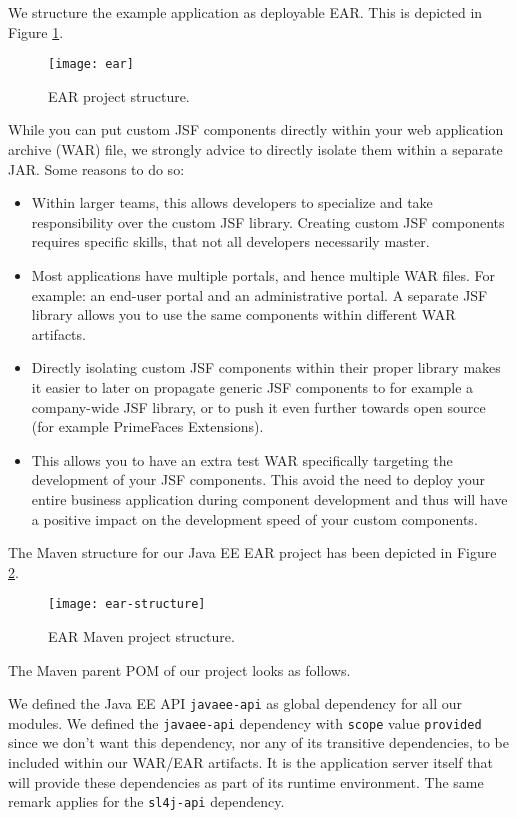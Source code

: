 We structure the example application as deployable EAR. This is depicted in Figure \ref{fig:ear}.
\begin{figure}[htbp]
	\begin{center}
		\texttt{[image: ear]}
		\caption{EAR project structure.}
		\label{fig:ear}
	\end{center}
\end{figure}
While you can put custom JSF components directly within your web application archive (WAR) file,
we strongly advice to directly isolate them within a separate JAR.
Some reasons to do so:
\begin{itemize}
	\item Within larger teams, this allows developers to specialize and take responsibility over the custom JSF library.
	Creating custom JSF components requires specific skills, that not all developers necessarily master.
	\item Most applications have multiple portals, and hence multiple WAR files. For example: an end-user portal and an administrative portal. A separate JSF library allows you to use the same components within different WAR artifacts.
	\item Directly isolating custom JSF components within their proper library makes it easier to later on propagate generic JSF components to for example a company-wide JSF library, or to push it even further towards open source (for example PrimeFaces Extensions).
	\item This allows you to have an extra test WAR specifically targeting the development of your JSF components.
	This avoid the need to deploy your entire business application during component development and thus will have a positive impact on the development speed of your custom components.
\end{itemize}
The Maven structure for our Java EE EAR project has been depicted in Figure \ref{fig:ear-structure}.
\begin{figure}[htbp]
	\begin{center}
		\texttt{[image: ear-structure]}
		\caption{EAR Maven project structure.}
		\label{fig:ear-structure}
	\end{center}
\end{figure}

The Maven parent POM of our project looks as follows.

We defined the Java EE API \texttt{javaee-api} as global dependency for all our modules.
We defined the \texttt{javaee-api} dependency with \texttt{scope} value \texttt{provided} since we don't want this dependency, nor any of its transitive dependencies, to be included within our WAR/EAR artifacts.
It is the application server itself that will provide these dependencies as part of its runtime environment.
The same remark applies for the \texttt{sl4j-api} dependency.

